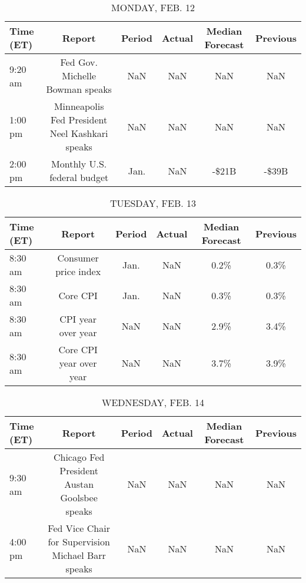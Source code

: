 \documentclass{article}%
\begin{document}
%
\normalsize%


\begin{table}[htbp]%
\caption{MONDAY, FEB. 12}%
\centering%
\begin{adjustbox}{width=1\textwidth}%
\begin{tabular}{lccccc}
\toprule
Time (ET) &                                         Report & Period & Actual & Median Forecast & Previous \\
\midrule
  9:20 am &                Fed Gov. Michelle Bowman speaks &    NaN &    NaN &             NaN &      NaN \\
  1:00 pm & Minneapolis Fed President Neel Kashkari speaks &    NaN &    NaN &             NaN &      NaN \\
  2:00 pm &                    Monthly U.S. federal budget &   Jan. &    NaN &           -\$21B &    -\$39B \\
\bottomrule
\end{tabular}
%
\end{adjustbox}%
\end{table}

%


\begin{table}[htbp]%
\caption{TUESDAY, FEB. 13}%
\centering%
\begin{adjustbox}{width=1\textwidth}%
\begin{tabular}{lccccc}
\toprule
Time (ET) &                  Report & Period & Actual & Median Forecast & Previous \\
\midrule
  8:30 am &    Consumer price index &   Jan. &    NaN &            0.2\% &     0.3\% \\
  8:30 am &                Core CPI &   Jan. &    NaN &            0.3\% &     0.3\% \\
  8:30 am &      CPI year over year &    NaN &    NaN &            2.9\% &     3.4\% \\
  8:30 am & Core CPI year over year &    NaN &    NaN &            3.7\% &     3.9\% \\
\bottomrule
\end{tabular}
%
\end{adjustbox}%
\end{table}

%


\begin{table}[htbp]%
\caption{WEDNESDAY, FEB. 14}%
\centering%
\begin{adjustbox}{width=1\textwidth}%
\begin{tabular}{lccccc}
\toprule
Time (ET) &                                             Report & Period & Actual & Median Forecast & Previous \\
\midrule
  9:30 am &       Chicago Fed President Austan Goolsbee speaks &    NaN &    NaN &             NaN &      NaN \\
  4:00 pm & Fed Vice Chair for Supervision Michael Barr speaks &    NaN &    NaN &             NaN &      NaN \\
\bottomrule
\end{tabular}
%
\end{adjustbox}%
\end{table}
\end{document}
